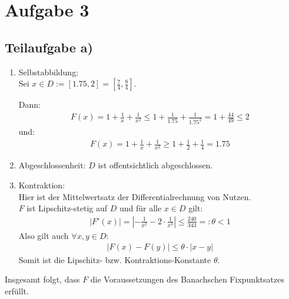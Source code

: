 \section*{Aufgabe 3}
\subsection*{Teilaufgabe a)}

\begin{enumerate}
\item Selbstabbildung: \\
	Sei $x \in D := [1.75 , 2] = [\frac{7}{4}, \frac{8}{4}]$.

	Dann:
	\begin{align}
		F(x) = 1 + \frac{1}{x} + \frac{1}{x^2} \le 1 + \frac{1}{1.75} + \frac{1}{1.75^2} = 1 + \frac{44}{49} \le 2 %
	\end{align}
	und: \\
	\begin{align}
		F(x) = 1 + \frac{1}{x} + \frac{1}{x^2} \ge 1 + \frac{1}{2} + \frac{1}{4} = 1.75
	\end{align}

\item Abgeschlossenheit: $D$ ist offentsichtlich abgeschlossen.
\item Kontraktion: \\ %
    Hier ist der Mittelwertsatz der Differentialrechnung von Nutzen.\\
	$F$ ist Lipschitz-stetig auf $D$ und für alle $x \in D$ gilt: \\
	\begin{align}
		|F'(x)| = |-\frac{1}{x^2}-2 \cdot \frac{1}{x^3}| \le \frac{240}{343} =: \theta < 1
	\end{align}
	Also gilt auch $\forall x,y \in D $:
	\begin{align}
		|F(x) - F(y)| \le \theta \cdot |x - y|
	\end{align}
	Somit ist die Lipschitz- bzw. Kontraktions-Konstante $\theta$.
\end{enumerate}
Insgesamt folgt, dass $F$ die Voraussetzungen des Banachschen Fixpunktsatzes erfüllt.
